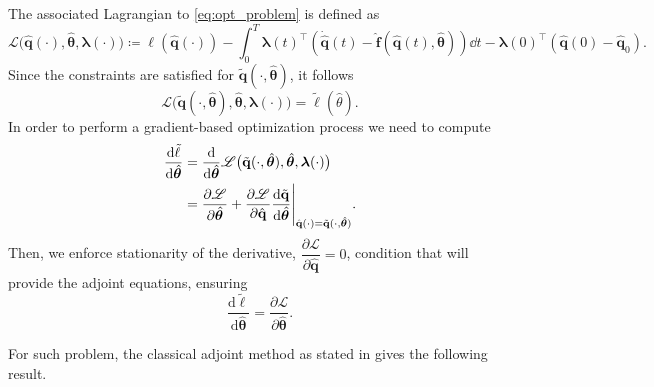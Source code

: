 The associated Lagrangian to \eqref{eq:opt_problem} is defined as\\
\begin{equation}
        \mathscr{L}\bigl(\hat{\mathbf{q}}(\cdot),\hat{\bm{\theta}},\bm{\lambda}(\cdot)\bigr) \coloneqq \ell(\hat{\mathbf{q}}(\cdot)) - \int_0^T \bm{\lambda}(t)^{\top}\left( \dot{\hat{\mathbf{q}}}(t)-\hat{\mathbf{f}}(\hat{\mathbf{q}}(t),\hat{\bm{\theta}}) \right)\dd t - \bm{\lambda}(0)^{\top}(\hat{\mathbf{q}}(0)-\hat{\mathbf{q}}_0).
        \label{eq:lagrange_cost}
    \end{equation}
Since the constraints are satisfied for $\tilde{\mathbf{q}}(\cdot,\hat{\bm{\theta}})$, it follows\\
$$\mathscr{L}\bigl(\tilde{\mathbf{q}}(\cdot,\hat{\bm{\theta}}),\hat{\bm{\theta}}, \bm{\lambda}(\cdot)\bigr) = \tilde{\ell} (\hat{\theta}).$$
In order to perform a gradient-based optimization process we need to compute\\
\begin{align*}
    \dv{\tilde{\ell}}{\hat{\bm{\theta}}} &= \dv{}{\hat{\bm{\theta}}} \mathscr{L}\bigl(\tilde{\mathbf{q}}(\cdot,\hat{\bm{\theta}}),\hat{\bm{\theta}},\bm{\lambda}(\cdot)\bigr) \\
    &= \dfrac{\partial\mathscr{L}}{\partial\hat{\bm{\theta}}} + \dfrac{\partial\mathscr{L}}{\partial\hat{\mathbf{q}}} \dfrac{\textrm{d}\tilde{\mathbf{q}}}{\textrm{d}\hat{\bm{\theta}}}\Bigg\vert_{\hat{\mathbf{q}}(\cdot) = \tilde{\mathbf{q}}(\cdot, \hat{\bm{\theta}} ) }.
\end{align*}
Then, we enforce stationarity of the derivative, $\dfrac{\partial\mathscr{L}}{\partial\hat{\mathbf{q}}} = 0$, condition that will provide the adjoint equations, ensuring\\
\begin{equation}
  \label{eq:equal_grad}
  \frac{\mathrm{d}\tilde{\ell}}{\mathrm{d}\hat{\bm{\theta}}}
  = \frac{\partial\mathscr{L}}{\partial\hat{\bm{\theta}}}.
\end{equation}

For such problem, the classical adjoint method as stated in \cite{bradley2024pde,luchini2024introduction} gives the following result.

